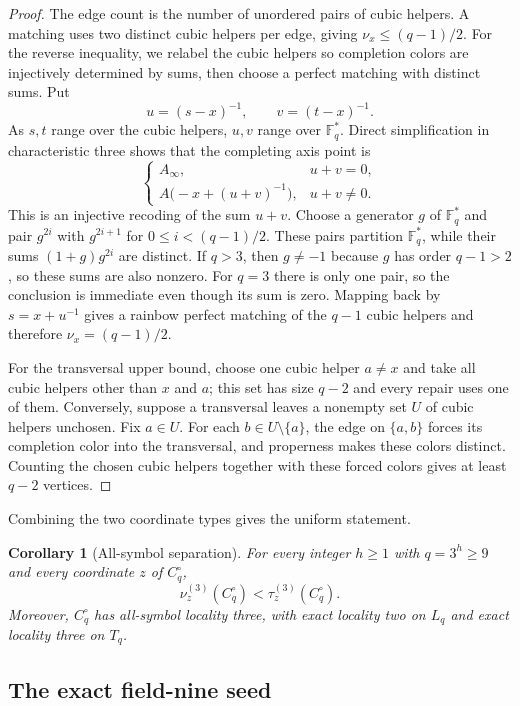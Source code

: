 \documentclass[11pt]{article}
\newtheorem{corollary}[theorem]{Corollary}
\theoremstyle{definition}
\theoremstyle{remark}
\newcommand{\F}{\mathbb{F}}
\begin{document}
\begin{proof}
The edge count is the number of unordered pairs of cubic helpers.  A matching
uses two distinct cubic helpers per edge, giving $\nu_x\leq(q-1)/2$.  For the
reverse inequality, we relabel the cubic helpers so completion colors are
injectively determined by sums, then choose a perfect matching with distinct
sums.  Put
\[
 u=(s-x)^{-1},\qquad v=(t-x)^{-1}.
\]
As $s,t$ range over the cubic helpers, $u,v$ range over $\F_q^*$.  Direct
simplification in characteristic three shows that the completing axis point
is
\[
 \begin{cases}
 A_\infty,&u+v=0,\\
 A\bigl(-x+(u+v)^{-1}\bigr),&u+v\ne0.
 \end{cases}
\]
This is an injective recoding of the sum $u+v$.  Choose a generator $g$ of
$\F_q^*$ and pair $g^{2i}$ with $g^{2i+1}$ for
$0\leq i<(q-1)/2$.  These pairs partition $\F_q^*$, while their sums
$(1+g)g^{2i}$ are distinct.  If $q>3$, then $g\ne-1$ because $g$ has order
$q-1>2$, so these sums are also nonzero.  For $q=3$ there is only one pair,
so the conclusion is immediate even though its sum is zero.  Mapping back by
$s=x+u^{-1}$ gives a rainbow perfect matching of the $q-1$ cubic helpers and
therefore $\nu_x=(q-1)/2$.

For the transversal upper bound, choose one cubic helper $a\ne x$ and take
all cubic helpers other than $x$ and $a$; this set has size $q-2$ and every
repair uses one of them.  Conversely, suppose a transversal leaves a
nonempty set $U$ of cubic helpers unchosen.  Fix $a\in U$.  For each
$b\in U\setminus\{a\}$, the edge on $\{a,b\}$ forces its completion color
into the transversal, and properness makes these colors distinct.  Counting
the chosen cubic helpers together with these forced colors gives at least
$q-2$ vertices.
\end{proof}

Combining the two coordinate types gives the uniform statement.

\begin{corollary}[All-symbol separation]\label{cor:uniform-gap}
For every integer $h\geq1$ with $q=3^h\geq9$ and every coordinate $z$ of $C_q^\circ$,
\[
 \nu_z^{(3)}(C_q^\circ)<\tau_z^{(3)}(C_q^\circ).
\]
Moreover, $C_q^\circ$ has all-symbol locality three, with exact locality two on
$L_q$ and exact locality three on $T_q$.
\end{corollary}

\subsection{The exact field-nine seed}
\end{document}
